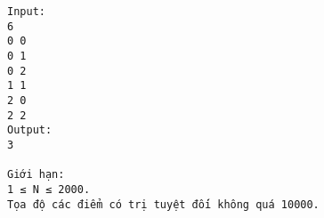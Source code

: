 \begin{verbatim}
Input:
6
0 0
0 1
0 2
1 1
2 0
2 2
Output:
3

Giới hạn:
1 ≤ N ≤ 2000.
Tọa độ các điểm có trị tuyệt đối không quá 10000.
\end{verbatim}